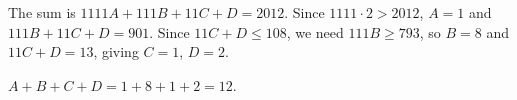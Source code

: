 The sum is $1111A+111B+11C+D=2012$. Since $1111\cdot2>2012$, $A=1$ and $111B+11C+D=901$. Since $11C+D\le108$, we need $111B\ge793$, so $B=8$ and $11C+D=13$, giving $C=1$, $D=2$.

$A+B+C+D=1+8+1+2=\boxed{12}$.
